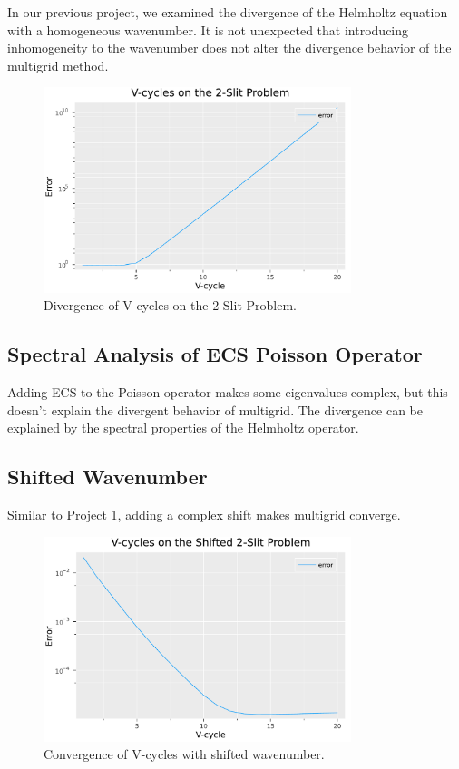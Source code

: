 \documentclass[a4paper,12pt]{article}
\begin{document}
In our previous project, we examined the divergence of the Helmholtz equation with a homogeneous wavenumber.
It is not unexpected that introducing inhomogeneity to the wavenumber does not alter the divergence behavior
of the multigrid method.

\begin{figure}[h!]
    \centering
    \includegraphics[width=0.8\textwidth]{../plots/Convergence_of_V-cycles_on_the_2-Slit_Problem.pdf}
    \caption{Divergence of V-cycles on the 2-Slit Problem.}
    \label{fig:Convergence_of_V-cycles_on_the_2-Slit_Problem}
\end{figure}

\subsection{Spectral Analysis of ECS Poisson Operator}
Adding ECS to the Poisson operator makes some eigenvalues complex, but this doesn't explain the
divergent behavior of multigrid. The divergence can be explained by the spectral properties of the Helmholtz
operator.

\subsection{Shifted Wavenumber}
Similar to Project 1, adding a complex shift makes multigrid converge.
\begin{figure}[h!]
    \centering
    \includegraphics[width=0.8\textwidth]{../plots/Vcycles_shifted2slit.pdf}
    \caption{Convergence of V-cycles with shifted wavenumber.}
    \label{fig:../plots/Vcycles_shifted2slit.pdf}
\end{figure}
\end{document}
